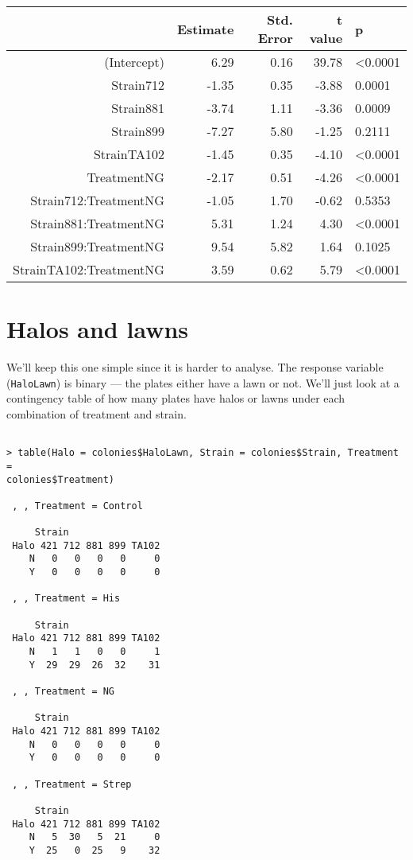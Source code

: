 \begin{table}[ht]
	\begin{center}
		\begin{tabular}{rrrrl}
		  \hline
		 & Estimate & Std. Error & t value & p \\ 
		  \hline
		(Intercept) & 6.29 & 0.16 & 39.78 & <0.0001 \\ 
		  Strain712 & -1.35 & 0.35 & -3.88 & \phantom{<}0.0001 \\ 
		  Strain881 & -3.74 & 1.11 & -3.36 & \phantom{<}0.0009 \\ 
		  Strain899 & -7.27 & 5.80 & -1.25 & \phantom{<}0.2111 \\ 
		  StrainTA102 & -1.45 & 0.35 & -4.10 & <0.0001 \\ 
		  TreatmentNG & -2.17 & 0.51 & -4.26 & <0.0001 \\ 
		  Strain712:TreatmentNG & -1.05 & 1.70 & -0.62 & \phantom{<}0.5353 \\ 
		  Strain881:TreatmentNG & 5.31 & 1.24 & 4.30 & <0.0001 \\ 
		  Strain899:TreatmentNG & 9.54 & 5.82 & 1.64 & \phantom{<}0.1025 \\ 
		  StrainTA102:TreatmentNG & 3.59 & 0.62 & 5.79 & <0.0001 \\ 
		   \hline
		\end{tabular}
	\end{center}
\end{table}

\section{Halos and lawns}

We'll keep this one simple since it is harder to analyse. The response 
variable ({\tt HaloLawn}) is binary --- the plates either have a lawn 
or not. We'll just look at a contingency table of how many plates have 
halos or lawns under each combination of treatment and strain.

\begin{lstlisting}

> table(Halo = colonies$HaloLawn, Strain = colonies$Strain, Treatment = 
colonies$Treatment)

 , , Treatment = Control
 
     Strain
 Halo 421 712 881 899 TA102
    N   0   0   0   0     0
    Y   0   0   0   0     0
 
 , , Treatment = His
 
     Strain
 Halo 421 712 881 899 TA102
    N   1   1   0   0     1
    Y  29  29  26  32    31
 
 , , Treatment = NG
 
     Strain
 Halo 421 712 881 899 TA102
    N   0   0   0   0     0
    Y   0   0   0   0     0
 
 , , Treatment = Strep
 
     Strain
 Halo 421 712 881 899 TA102
    N   5  30   5  21     0
    Y  25   0  25   9    32
 
\end{lstlisting}

